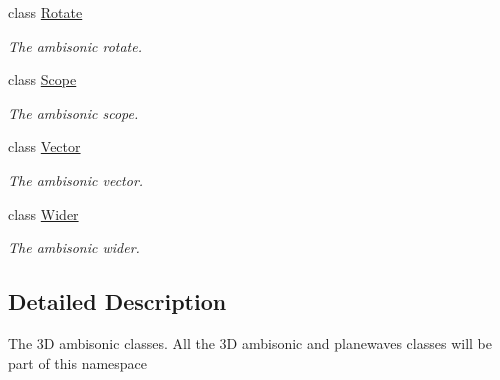\begin{DoxyCompactItemize}
class \hyperlink{class_hoa3_d_1_1_rotate}{Rotate}
\begin{DoxyCompactList}\small\item\em The ambisonic rotate. \end{DoxyCompactList}\item 
class \hyperlink{class_hoa3_d_1_1_scope}{Scope}
\begin{DoxyCompactList}\small\item\em The ambisonic scope. \end{DoxyCompactList}\item 
class \hyperlink{class_hoa3_d_1_1_vector}{Vector}
\begin{DoxyCompactList}\small\item\em The ambisonic vector. \end{DoxyCompactList}\item 
class \hyperlink{class_hoa3_d_1_1_wider}{Wider}
\begin{DoxyCompactList}\small\item\em The ambisonic wider. \end{DoxyCompactList}\end{DoxyCompactItemize}


\subsection{Detailed Description}
The 3\-D ambisonic classes. All the 3\-D ambisonic and planewaves classes will be part of this namespace 